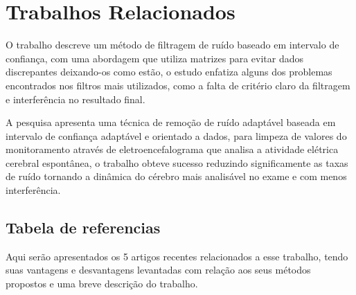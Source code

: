\section{Trabalhos Relacionados}%

O trabalho \cite{kalambet2011noise} descreve um método de filtragem de ruído baseado em intervalo de confiança, com uma abordagem que utiliza matrizes para evitar dados discrepantes deixando-os como estão, o estudo enfatiza alguns dos problemas encontrados nos filtros mais utilizados, como a falta de critério claro da filtragem e interferência no resultado final. 

A pesquisa \cite{madhale2020adaptive} apresenta uma técnica de remoção de ruído adaptável baseada em intervalo de confiança adaptável e orientado a dados, para limpeza de valores do monitoramento através de eletroencefalograma que analisa a atividade elétrica cerebral espontânea, o trabalho obteve sucesso reduzindo significamente as taxas de ruído tornando a dinâmica do cérebro mais analisável no exame e com menos interferência.
\pagebreak
\subsection{Tabela de referencias}
Aqui serão apresentados os 5 artigos recentes relacionados a esse trabalho, tendo suas vantagens e desvantagens levantadas com relação aos seus métodos propostos e uma breve descrição do trabalho.

